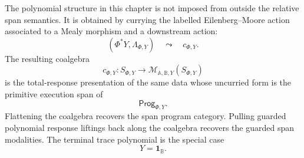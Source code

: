 \begin{remark}
\label{rem:poly-relative-final-summary}
The polynomial structure in this chapter is not imposed from outside the
relative span semantics.  It is obtained by currying the labelled
Eilenberg--Moore action associated to a Mealy morphism and a downstream action:
\[
(\Phi^\ast Y,\Lambda_{\Phi,Y})
\quad
\leadsto
\quad
c_{\Phi,Y}.
\]
The resulting coalgebra
\[
c_{\Phi,Y}:
S_{\Phi,Y}\to
\mathcal M_{\mathbb A,\mathbb B,Y}(S_{\Phi,Y})
\]
is the total-response presentation of the same data whose uncurried form is
the primitive execution span of
\[
\mathsf{Prog}_{\Phi,Y}.
\]
Flattening the coalgebra recovers the span program category.  Pulling guarded
polynomial response liftings back along the coalgebra recovers the guarded span
modalities.  The terminal trace polynomial is the special case
\[
Y=\mathbf 1_{\mathbb B}.
\]
\end{remark}